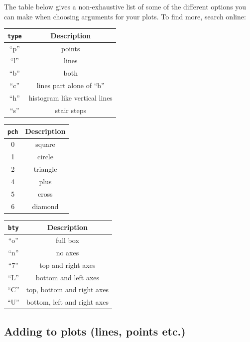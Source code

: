 \documentclass[
]{book}
\theoremstyle{definition}
\theoremstyle{definition}
\theoremstyle{definition}
\theoremstyle{definition}
\theoremstyle{remark}
\begin{document}
The table below gives a non-exhaustive list of some of the different options you can make when choosing arguments for your plots. To find more, search online:

\begin{longtable}[]{@{}cc@{}}
\toprule()
\texttt{type} & Description \\
\midrule()
\endhead
``p'' & points \\
``l'' & lines \\
``b'' & both \\
``c'' & lines part alone of ``b'' \\
``h'' & histogram like vertical lines \\
``s'' & stair steps \\
\bottomrule()
\end{longtable}

\begin{longtable}[]{@{}cc@{}}
\toprule()
\texttt{pch} & Description \\
\midrule()
\endhead
0 & square \\
1 & circle \\
2 & triangle \\
4 & plus \\
5 & cross \\
6 & diamond \\
\bottomrule()
\end{longtable}

\begin{longtable}[]{@{}cc@{}}
\toprule()
\texttt{bty} & Description \\
\midrule()
\endhead
``o'' & full box \\
``n'' & no axes \\
``7'' & top and right axes \\
``L'' & bottom and left axes \\
``C'' & top, bottom and right axes \\
``U'' & bottom, left and right axes \\
\bottomrule()
\end{longtable}

\hypertarget{adding-to-plots-lines-points-etc.}{%
\subsection{Adding to plots (lines, points etc.)}\label{adding-to-plots-lines-points-etc.}}
\end{document}
